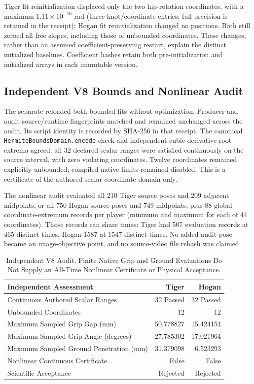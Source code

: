 \documentclass[11pt,letterpaper]{article}
\newcommand{\code}[1]{\nolinkurl{#1}}
\begin{document}
Tiger fit reinitialization displaced only the two hip-rotation coordinates,
with a maximum $1.11\times10^{-16}$ rad (three knot/coordinate
entries; full precision is retained in the receipt); Hogan fit reinitialization changed no positions. Both still zeroed
all free slopes, including those of unbounded coordinates. These changes,
rather than an assumed coefficient-preserving restart, explain the distinct
initialized baselines. Coefficient hashes retain both pre-initialization and
initialized arrays in each immutable version.

\subsection{Independent V8 Bounds and Nonlinear Audit}
The separate  reloaded both
bounded fits without optimization. Producer and audit source/runtime
fingerprints matched and remained unchanged across the audit. Its script
identity is recorded by SHA-256 in that receipt. The canonical
\code{HermiteBoundsDomain.encode} check and independent cubic derivative-root
extrema agreed: all 32 declared scalar ranges were satisfied continuously on
the source interval, with zero violating coordinates. Twelve coordinates
remained explicitly unbounded; compiled native limits remained disabled.
This is a certificate of the authored scalar coordinate domain only.

The nonlinear audit evaluated all 210 Tiger source poses and 209 adjacent
midpoints, or all 750 Hogan source poses and 749 midpoints, plus 88 global
coordinate-extremum records per player (minimum and maximum for each of 44
coordinates). Those records can share times: Tiger had 507 evaluation records
at 465 distinct times, Hogan 1587 at 1547 distinct times. No added audit pose
became an image-objective point, and no source-video file rehash was claimed.

\begin{table}[ht]
\centering\small
\begin{tabular}{@{}lrr@{}}
\toprule Independent Assessment & Tiger & Hogan\\\midrule
Continuous Authored Scalar Ranges & 32 Passed & 32 Passed\\
Unbounded Coordinates & 12 & 12\\
Maximum Sampled Grip Gap (mm) & 50.778827 & 15.424154\\
Maximum Sampled Grip Angle (degrees) & 27.785302 & 17.021964\\
Maximum Sampled Ground Penetration (mm) & 31.379098 & 6.523293\\
Nonlinear Continuous Certificate & False & False\\
Scientific Acceptance & Rejected & Rejected\\
\bottomrule
\end{tabular}
\caption{Independent V8 Audit. Finite Native Grip and Ground Evaluations Do Not
Supply an All-Time Nonlinear Certificate or Physical Acceptance.}
\end{table}
\end{document}
